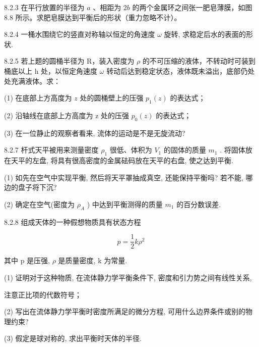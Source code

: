 \begin{problem}{8.2.3}
在平行放置的半径为 $a$ 、相距为 $2b$ 的两个金属环之间张一肥皂薄膜，如图 8.8 所示。求肥皂膜达到平衡后的形状（重力忽略不计）。
\begin{center}

\end{center}
\end{problem}
\clearpage


\begin{problem}{8.2.4}
一桶水围绕它的竖直对称轴以恒定的角速度 $\omega$ 旋转, 求稳定后水的表面的形状.
\end{problem}
\clearpage


\begin{problem}{8.2.5}
若上题的圆桶半径为 R，装入密度为 $\rho$ 的不可压缩的液体，不转动时可装到桶底以上 h 处，以恒定角速度 $\omega$ 转动后达到稳定状态，液体既未溢出，底部仍处处充满液体。求：

(1) 在底部上方高度为 $z$ 处的圆桶壁上的压强 $p_1(z)$ 的表达式；

(2) 沿轴线在底部上方高度为 z 处的压强 $p_{0}(z)$ 的表达式；

(3) 在一位静止的观察者看来, 流体的运动是不是无旋流动?
\end{problem}
\clearpage


\begin{problem}{8.2.7}
杆式天平被用来测量密度 $\rho_{1}$ 很低、体积为 $V_{1}$ 的固体的质量 $m_{1}$ . 将固体放在天平的左盘, 将具有很高密度的金属砝码放在天平的右盘, 使之达到平衡.

(1) 如先在空气中实现平衡, 然后将天平罩抽成真空, 还能保持平衡吗? 若不能, 哪边的盘子将下沉?

(2) 确定在空气(密度为 $\rho_{A}$ ) 中达到平衡测得的质量 $m_{1}$ 的百分数误差.
\end{problem}
\clearpage


\begin{problem}{8.2.8}
组成天体的一种假想物质具有状态方程

\[
p = \frac {1}{2} k \rho^ {2}
\]

其中 p 是压强, $\rho$ 是质量密度, k 为常量.

(1) 证明对于这种物质, 在流体静力学平衡条件下, 密度和引力势之间有线性关系,

注意正比项的代数符号；

(2) 写出在流体静力学平衡时密度所满足的微分方程, 可用什么边界条件或别的物理约束?

(3) 假定是球对称的, 求出平衡时天体的半径.
\end{problem}
\clearpage


